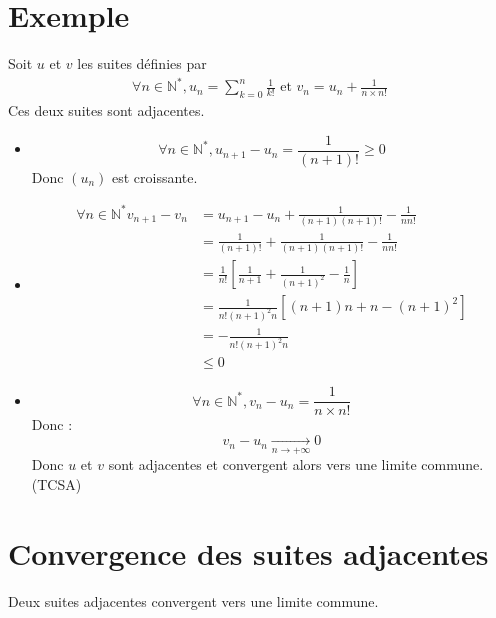 \documentclass[../main.tex]{subfiles}
\begin{document}
\setcounter{section}{53}
\section{Exemple}
\begin{tcolorbox}[title=Exemple 14.54, title filled=false, colframe=darkgreen, colback=darkgreen!10!white]
    Soit $u$ et $v$ les suites définies par 
    \begin{align*}
        \forall n \in \mathbb{N}^*, u_n = \sum_{k=0}^{n} \frac{1}{k!} \text{ et } v_n = u_n + \frac{1}{n \times n!}
    \end{align*}
    Ces deux suites sont adjacentes. 
\end{tcolorbox}

\begin{itemize}
    \item $$\forall n \in \mathbb{N}^*, u_{n+1} - u_n = \frac{1}{(n+1)!} \geq 0$$
    Donc $(u_n)$ est croissante. 

    \item \begin{align*}
        \forall n \in \mathbb{N}^* v_{n+1} - v_n &= u_{n+1} - u_n + \frac{1}{(n+1)(n+1)!} - \frac{1}{nn!} \\
        &= \frac{1}{(n+1)!} + \frac{1}{(n+1)(n+1)!} - \frac{1}{nn!} \\
        &= \frac{1}{n!} \left[ \frac{1}{n+1} + \frac{1}{(n+1)^2} - \frac{1}{n} \right] \\
        &= \frac{1}{n!(n+1)^2n} [(n+1)n + n - (n+1)^2] \\
        &= - \frac{1}{n!(n+1)^2 n} \\
        &\leq 0
    \end{align*}

    \item $$\forall n \in \mathbb{N}^*, v_n - u_n = \frac{1}{n \times n!}$$
    Donc : 
    $$v_n - u_n \underset{n \to +\infty}{\longrightarrow} 0$$
    Donc $u$ et $v$ sont adjacentes et convergent alors vers une limite commune. (TCSA)
\end{itemize}


\section{Convergence des suites adjacentes}
\begin{tcolorbox}[title=Théorème 14.55, title filled=false, colframe=orange, colback=orange!10!white]
    Deux suites adjacentes convergent vers une limite commune. 
\end{tcolorbox}
\end{document}
